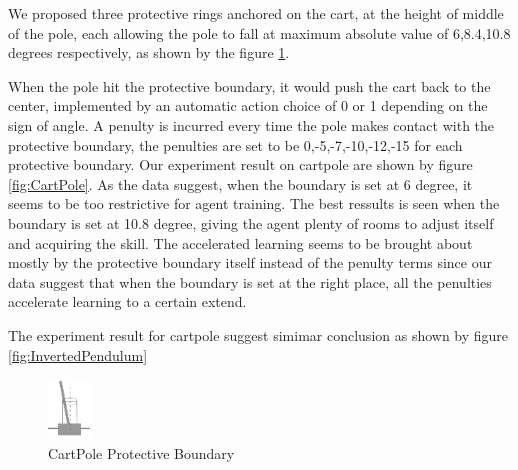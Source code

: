 \documentclass[journal]{IEEEtran}
\begin{document}
We proposed three protective rings anchored on the cart, at the height of middle of the pole, each allowing the pole to fall at maximum absolute value of 6,8.4,10.8 degrees respectively, as shown by the figure \ref{fig:cartpolePB}.

When the pole hit the protective boundary, it would push the cart back to the center, implemented by an automatic action choice of 0 or 1 depending on the sign of angle. A penulty is incurred every time the pole makes contact with the protective boundary, the penulties are set to be 0,-5,-7,-10,-12,-15 for each protective boundary. Our experiment result on cartpole are shown by figure \ref{fig:CartPole}. As the data suggest, when the boundary is set at 6 degree, it seems to be too restrictive for agent training. The best ressults is seen when the boundary is set at 10.8 degree, giving the agent plenty of rooms to adjust itself and acquiring the skill. The accelerated learning seems to be brought about mostly by the protective boundary itself instead of the penulty terms since our data suggest that when the boundary is set at the right place, all the penulties accelerate learning to a certain extend.

The experiment result for cartpole suggest simimar conclusion as shown by figure \ref{fig:InvertedPendulum}

\begin{figure}
     \centering
      \includegraphics[width=0.1\textwidth]{cartpole1.png}
      \caption{CartPole Protective Boundary}
      \label{fig:cartpolePB}
\end{figure}
\end{document}
